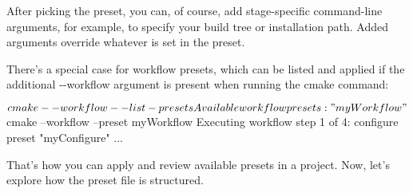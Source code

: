 After picking the preset, you can, of course, add stage-specific command-line arguments, for example, to specify your build tree or installation path. Added arguments override whatever is set in the preset.

There’s a special case for workflow presets, which can be listed and applied if the additional -{}-workflow argument is present when running the cmake command:

\begin{shell}
$ cmake --workflow --list-presets
Available workflow presets:
    "myWorkflow"
$ cmake --workflow --preset myWorkflow
Executing workflow step 1 of 4: configure preset "myConfigure"
...
\end{shell}

That’s how you can apply and review available presets in a project. Now, let’s explore how the preset file is structured.

























